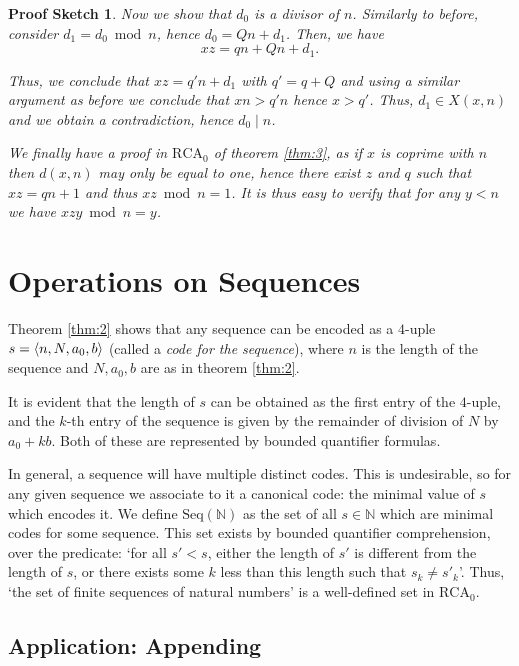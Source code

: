 \documentclass{article}
\theoremstyle{nonumberplain}
\newtheorem{sketch}{Proof Sketch}
\newcommand{\N}{\mathbb{N}}
\newcommand{\RCA}{\mathrm{RCA}}
\newcommand{\Seq}{\mathrm{Seq}}
\DeclarePairedDelimiter{\braket}{\langle}{\rangle}
\begin{document}
\begin{sketch}
\smallskip

Now we show that $d_0$ is a divisor of $n$. Similarly to before, consider $d_1 = d_0 \bmod n$, hence $d_0 = Q n + d_1$. Then, we have
\begin{equation}
xz = qn + Qn + d_1.
\end{equation}

Thus, we conclude that $xz = q'n + d_1$ with $q' = q+Q$ and using a similar argument as before we conclude that $xn > q' n$ hence $x > q'$. Thus, $d_1 \in X(x,n)$ and we obtain a contradiction, hence $d_0 \mid n$.

\smallskip

We finally have a proof in $\RCA_0$ of theorem \ref{thm:3}, as if $x$ is coprime with $n$ then $d(x,n)$ may only be equal to one, hence there exist $z$ and $q$ such that $xz = qn + 1$ and thus $xz \bmod n = 1$. It is thus easy to verify that for any $y < n$ we have $xzy \bmod n = y$.
\end{sketch}

\section{Operations on Sequences}\label{sec:op}

Theorem \ref{thm:2} shows that any sequence can be encoded as a $4$-uple $s = \braket{n,N,a_0,b}$ (called a \emph{code for the sequence}), where $n$ is the length of the sequence and $N, a_0, b$ are as in theorem \ref{thm:2}. 

It is evident that the length of $s$ can be obtained as the first entry of the $4$-uple, and the $k$-th entry of the sequence is given by the remainder of division of $N$ by $a_0 + k b$. Both of these are represented by bounded quantifier formulas.

In general, a sequence will have multiple distinct codes. This is undesirable, so for any given sequence we associate to it a canonical code: the minimal value of $s$ which encodes it. We define $\Seq(\N)$ as the set of all $s \in \N$ which are minimal codes for some sequence. This set exists by bounded quantifier comprehension, over the predicate: `for all $s' < s$, either the length of $s'$ is different from the length of $s$, or there exists some $k$ less than this length such that $s_k \neq s'_k$'. Thus, `the set of finite sequences of natural numbers' is a well-defined set in $\RCA_0$.

\subsection{Application: Appending}\label{subsec:app}
\end{document}
